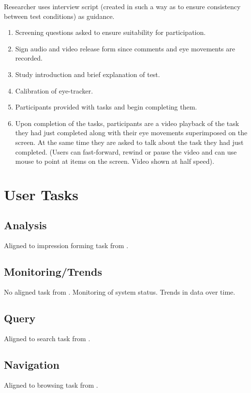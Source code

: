 Researcher uses interview script (created in such a way as to ensure consistency between test conditions) as guidance.

\begin{enumerate}
	\item Screening questions asked to ensure suitability for participation.
	\item Sign audio and video release form since comments and eye movements are recorded.
	\item Study introduction and brief explanation of test.
	\item Calibration of eye-tracker.
	\item Participants provided with tasks and begin completing them.
	\item Upon completion of the tasks, participants are a video playback of the task they had just completed along with their eye movements superimposed on the screen.  At the same time they are asked to talk about the task they had just completed. (Users can fast-forward, rewind or pause the video and can use mouse to point at items on the screen. Video shown at half speed).  
\end{enumerate}

\section{User Tasks}

\subsection{Analysis}
Aligned to impression forming task from \cite{rivadeneira07}.

\subsection{Monitoring/Trends}
No aligned task from \cite{rivadeneira07}. Monitoring of system status. Trends in data over time.

\subsection{Query}
Aligned to search task from \cite{rivadeneira07}.

\subsection{Navigation}
Aligned to browsing task from \cite{rivadeneira07}.

